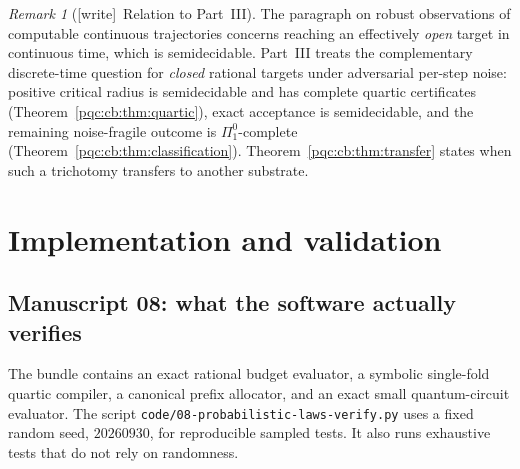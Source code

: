\documentclass[11pt,letterpaper]{article}
\numberwithin{equation}{section}
\theoremstyle{definition}
\theoremstyle{remark}
\newtheorem{remark}[theorem]{Remark}
\newcommand{\code}[1]{\nolinkurl{#1}}
\newcommand{\wtag}{\textup{[write]}}
\newcommand{\pione}{\Pi^0_1}
\begin{document}
\begin{remark}[\wtag\ Relation to Part~III]
The paragraph on robust observations of computable continuous trajectories
concerns reaching an effectively \emph{open} target in continuous time,
which is semidecidable. Part~III treats the complementary discrete-time
question for \emph{closed} rational targets under adversarial per-step
noise: positive critical radius is semidecidable and has complete quartic
certificates (Theorem~\ref{pqc:cb:thm:quartic}), exact acceptance is
semidecidable, and the remaining noise-fragile outcome is
$\pione$-complete (Theorem~\ref{pqc:cb:thm:classification}).
Theorem~\ref{pqc:cb:thm:transfer} states when such a trichotomy transfers
to another substrate.
\end{remark}

\section{Implementation and validation}
\label{pqc:conv:impl}\label{pqc:sec:audit}

\subsection{Manuscript 08: what the software actually verifies}
The bundle contains an exact rational budget evaluator, a symbolic
single-fold quartic compiler, a canonical prefix allocator, and an exact
small quantum-circuit evaluator. The script \code{code/08-probabilistic-laws-verify.py} uses a
fixed random seed, $20260930$, for reproducible sampled tests. It also runs
exhaustive tests that do not rely on randomness.
\end{document}
